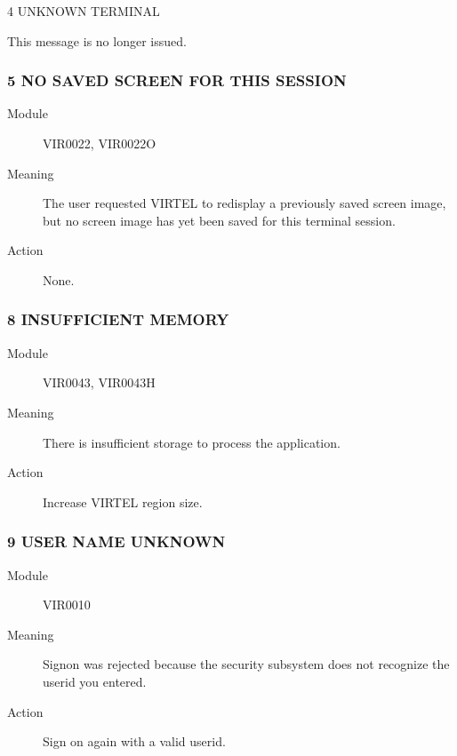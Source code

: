 \documentclass[letterpaper,10pt,english]{sphinxmanual}
\begin{document}
4 UNKNOWN TERMINAL

This message is no longer issued.


\subsubsection{5 NO SAVED SCREEN FOR THIS SESSION}
\label{\detokenize{messages:no-saved-screen-for-this-session}}\begin{description}
\item[{Module}] \leavevmode
VIR0022, VIR0022O

\item[{Meaning}] \leavevmode
The user requested VIRTEL to redisplay a previously saved screen image, but no screen image has yet been saved for this terminal session.

\item[{Action}] \leavevmode
None.

\end{description}


\subsubsection{8 INSUFFICIENT MEMORY}
\label{\detokenize{messages:insufficient-memory}}\begin{description}
\item[{Module}] \leavevmode
VIR0043, VIR0043H

\item[{Meaning}] \leavevmode
There is insufficient storage to process the application.

\item[{Action}] \leavevmode
Increase VIRTEL region size.

\end{description}


\subsubsection{9 USER NAME UNKNOWN}
\label{\detokenize{messages:user-name-unknown}}\begin{description}
\item[{Module}] \leavevmode
VIR0010

\item[{Meaning}] \leavevmode
Signon was rejected because the security subsystem does not recognize the userid you entered.

\item[{Action}] \leavevmode
Sign on again with a valid userid.

\end{description}
\end{document}
